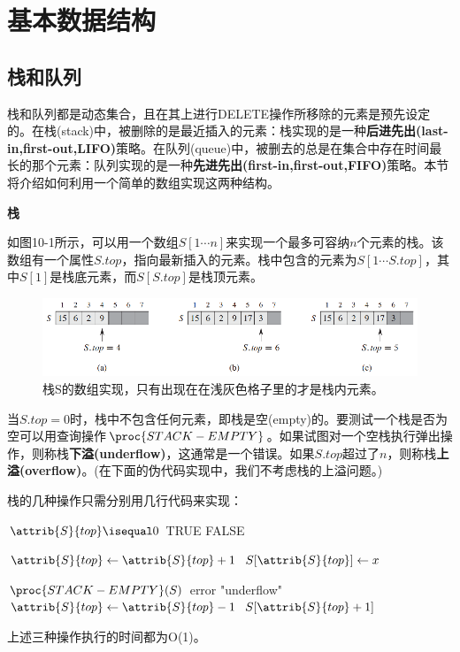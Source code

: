 \documentclass[a4paper,11pt]{ctexbook}
\begin{document}
\setcounter{chapter}{9}
\chapter{基本数据结构}
\section{栈和队列}
栈和队列都是动态集合，且在其上进行DELETE操作所移除的元素是预先设定的。在栈(stack)中，被删除的是最近插入的元素：栈实现的是一种\textbf{后进先出(last-in,first-out,LIFO)}策略。在队列(queue)中，被删去的总是在集合中存在时间最长的那个元素：队列实现的是一种\textbf{先进先出(first-in,first-out,FIFO)}策略。本节将介绍如何利用一个简单的数组实现这两种结构。

\textbf{栈}

如图10-1所示，可以用一个数组$ S[1 \cdots n] $来实现一个最多可容纳$ n $个元素的栈。该数组有一个属性$ S.top $，指向最新插入的元素。栈中包含的元素为$ S[1 \cdots S.top] $，其中$ S[1] $是栈底元素，而$ S[S.top] $是栈顶元素。
\begin{figure}[htbp]	
	\begin{center}
		\includegraphics{figure/10.1.eps}	
		\caption{栈S的数组实现，只有出现在在浅灰色格子里的才是栈内元素。}
	\end{center}	
\end{figure}

当$ S.top = 0 $时，栈中不包含任何元素，即栈是空(empty)的。要测试一个栈是否为空可以用查询操作$ \proc{STACK-EMPTY} $。如果试图对一个空栈执行弹出操作，则称栈\textbf{下溢(underflow)}，这通常是一个错误。如果$ S.top $超过了$ n $，则称栈\textbf{上溢(overflow)}。(在下面的伪代码实现中，我们不考虑栈的上溢问题。)

栈的几种操作只需分别用几行代码来实现：
\begin{codebox}
	\li \If $ \attrib{S}{top} \isequal 0 $
	\li \Then \Return TRUE
	\li \Else \Return FALSE	
\end{codebox}
\begin{codebox}
	\li $ \attrib{S}{top} \gets \attrib{S}{top} + 1 $
	\li $ S[\attrib{S}{top}] \gets x $
\end{codebox}
\begin{codebox}
	\li \If $ \proc{STACK-EMPTY}(S) $
	\li \Then error "underflow"
	\li \Else $ \attrib{S}{top} \gets \attrib{S}{top} - 1 $
	\li \Return $ S[\attrib{S}{top} + 1] $
\end{codebox}
上述三种操作执行的时间都为O(1)。
\end{document}
